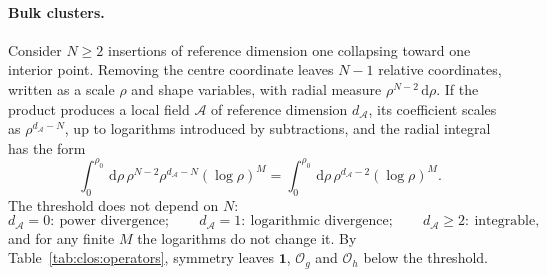 \documentclass[11pt,a4paper]{article}
\numberwithin{equation}{section}
\newcommand{\dd}{\,\mathrm d}
\newcommand{\Og}{\mathcal O_g}
\newcommand{\Oh}{\mathcal O_h}
\begin{document}
\paragraph{Bulk clusters.} Consider $N\ge2$ insertions of reference dimension one collapsing toward one interior
point. Removing the centre coordinate leaves $N-1$ relative coordinates, written as a scale $\rho$ and shape
variables, with radial measure $\rho^{N-2}\dd\rho$. If the product produces a local field $\mathcal A$ of reference
dimension $d_{\mathcal A}$, its coefficient scales as $\rho^{d_{\mathcal A}-N}$, up to logarithms introduced by
subtractions, and the radial integral has the form
\begin{equation}
 \int_0^{\rho_0}\dd\rho\,\rho^{N-2}\rho^{d_{\mathcal A}-N}(\log\rho)^M
 =\int_0^{\rho_0}\dd\rho\,\rho^{d_{\mathcal A}-2}(\log\rho)^M .
 \label{eq:clos:bulk}
\end{equation}
The threshold does not depend on $N$:
\begin{equation}
 d_{\mathcal A}=0:\ \text{power divergence};\qquad
 d_{\mathcal A}=1:\ \text{logarithmic divergence};\qquad
 d_{\mathcal A}\ge2:\ \text{integrable},
 \label{eq:clos:threshold}
\end{equation}
and for any finite $M$ the logarithms do not change it. By Table~\ref{tab:clos:operators}, symmetry leaves
$\mathbf 1$, $\Og$ and $\Oh$ below the threshold.
\end{document}
